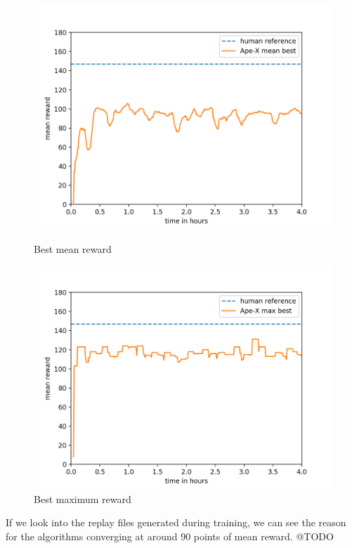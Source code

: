 \documentclass[12pt,a4paper]{article}
\begin{document}
\begin{figure}
    \centering
    \begin{minipage}{.5\textwidth}
        \centering
        \includegraphics[width=1\linewidth]{Figures/results_mean_best.png}
        \caption{Best mean reward}
        \label{fig:results_mean_best}
    \end{minipage}%
    \begin{minipage}{.5\textwidth}
        \centering
        \includegraphics[width=1\linewidth]{Figures/results_max_best.png}
        \caption{Best maximum reward}
        \label{fig:results_max_best}
    \end{minipage}
\end{figure}
If we look into the replay files generated during training, we can see the reason for the algorithms converging at around 90 points of mean reward. @TODO
\end{document}
